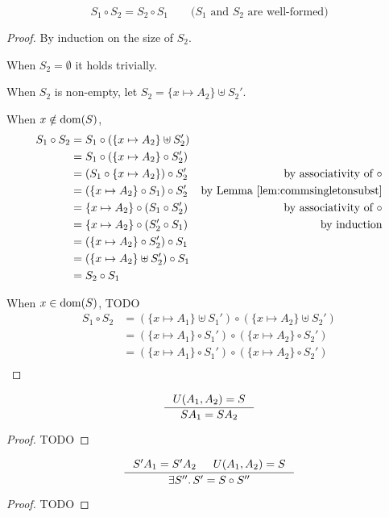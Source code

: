 \begin{theorem}
\[ S_1\circ S_2 = S_2\circ S_1 \qquad\text{($S_1$ and $S_2$ are well-formed)} \]
\end{theorem}
\begin{proof}
By induction on the size of $S_2$.

When $S_2=\emptyset$ it holds trivially.

When $S_2$ is non-empty, let $S_2=\{x\mapsto A_2\}\uplus S_2'$.

When $x\notin\mathop{\mathrm{dom}}(S)$,
\begin{align*}
S_1 \circ S_2
	&= S_1 \circ (\{x\mapsto A_2\}\uplus S_2') \\
	&= S_1 \circ (\{x\mapsto A_2\}\circ S_2') \\
	&= (S_1 \circ \{x\mapsto A_2\}) \circ S_2'
	& \text{by associativity of $\circ$} \\
	&= (\{x\mapsto A_2\}\circ S_1) \circ S_2'
	& \text{by Lemma \ref{lem:commsingletonsubst}} \\
	&= \{x\mapsto A_2\}\circ (S_1 \circ S_2')
	& \text{by associativity of $\circ$} \\
	&= \{x\mapsto A_2\}\circ (S_2' \circ S_1)
	& \text{by induction} \\
	&= (\{x\mapsto A_2\}\circ S_2') \circ S_1 \\
	&= (\{x\mapsto A_2\}\uplus S_2') \circ S_1 \\
	&= S_2 \circ S_1
\end{align*}

When $x\in\mathop{\mathrm{dom}}(S)$, TODO
\begin{align*}
S_1 \circ S_2
	&= (\{x\mapsto A_1\}\uplus S_1') \circ (\{x\mapsto A_2\}\uplus S_2') \\
	&= (\{x\mapsto A_1\}\circ S_1') \circ (\{x\mapsto A_2\}\circ S_2') \\
	&= (\{x\mapsto A_1\}\circ S_1') \circ (\{x\mapsto A_2\}\circ S_2') \\
\end{align*}
\end{proof}

\begin{theorem} \label{prop:uniU}
	\[ \inference{U(A_1,A_2)=S}{S A_1 = S A_2}\]
\end{theorem}
\begin{proof}
	TODO
\end{proof}

\begin{theorem} \label{prop:mguU}
\[ \inference{S' A_1 = S' A_2 & U(A_1,A_2)=S}{\exists S''.\, S' = S\circ S''} \]
\end{theorem}
\begin{proof}
	TODO
\end{proof}



